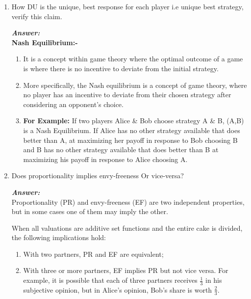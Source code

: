 \documentclass[15pt]{article}
\begin{document}
\begin{enumerate}
\item 
How DU is the unique, best response for each player i.e unique best strategy, verify this claim.

\textbf{\emph{Answer: }}\\ \textbf{Nash Equilibrium:-}
\begin{enumerate}
\item It is a concept within game theory where the optimal outcome of a game is where there is no incentive to deviate from the initial strategy.
\item More specifically, the Nash equilibrium is a concept of game theory, where no player has an incentive to deviate from their chosen strategy after considering an opponent's choice.
\item \textbf{For Example:} If two players Alice \& Bob choose strategy A \& B, (A,B) is a Nash Equilibrium. If Alice has no other strategy available that does better than A, at maximizing her payoff in response to Bob choosing B and B has no other strategy available that does better than B at maximizing his payoff in response to Alice choosing A.
\end{enumerate}
\item 
Does proportionality implies envy-freeness Or vice-versa?

\textbf{\emph{Answer: }}\\ 
Proportionality (PR) and envy-freeness (EF) are two independent properties, but in some cases one of them may imply the other.

When all valuations are additive set functions and the entire cake is divided, the following implications hold:
\begin{enumerate}
\item With two partners, PR and EF are equivalent;
\item With three or more partners, EF implies PR but not vice versa. For example, it is possible that each of three partners receives $\frac{1}{3}$ in his subjective opinion, but in Alice's opinion, Bob's share is worth $\frac{2}{3}$.


\end{enumerate}
\end{enumerate}
\end{document}
